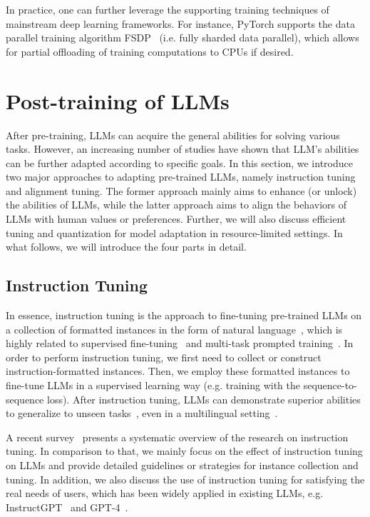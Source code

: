 In practice, one can further leverage the supporting training techniques of mainstream deep learning  frameworks. For instance, PyTorch supports the data parallel training algorithm  FSDP~\cite{FairScale2021} (i.e. fully sharded data parallel), which  allows for  partial offloading of training computations to CPUs if desired. 

\section{Post-training of LLMs}
\label{sec-adaptation}

After pre-training, LLMs can acquire the general abilities for  solving various tasks. However, an increasing number of studies have shown  that LLM's abilities can be further adapted according to specific goals. In this section, we introduce two major approaches to adapting pre-trained LLMs, namely instruction tuning and alignment tuning. The former approach  mainly aims to enhance (or unlock) the abilities of LLMs, while the latter approach aims to align the behaviors of LLMs with human values or preferences. Further, we will also discuss  efficient tuning and quantization for  model adaptation in resource-limited settings. In what follows, we will introduce the four parts in detail. 

\subsection{Instruction Tuning}
\label{sec-instruction}
In essence, instruction tuning is the approach to fine-tuning  pre-trained  LLMs on a collection of formatted instances in the form of natural language~\cite{Wei-ICLR-2022-Finetuned}, which is highly related to supervised fine-tuning~\cite{Ouyang-arxiv-2022-Training} and multi-task prompted training~\cite{Sanh-ICLR-2022-Multitask}. In order to perform instruction tuning, we first need to collect or construct instruction-formatted instances. Then, we employ these formatted instances to fine-tune LLMs in a supervised learning way (e.g. training with the sequence-to-sequence loss). After instruction tuning, LLMs can demonstrate superior abilities to generalize to unseen tasks~\cite{Wei-ICLR-2022-Finetuned,Sanh-ICLR-2022-Multitask,Chung-arxiv-2022-Scaling}, even in a multilingual setting~\cite{Muennighoff-2022-arxiv-Crosslingual}. 

A recent survey~\cite{Lou-arXiv-2023-Is} presents a systematic overview of the research on instruction tuning. In comparison to that, we mainly focus on the effect of instruction tuning on LLMs and provide detailed guidelines or strategies for instance collection and tuning. In addition, we also discuss the use of instruction tuning for satisfying the real needs of users, which has been widely applied in existing LLMs, e.g. InstructGPT~\cite{Ouyang-arxiv-2022-Training} and GPT-4~\cite{OpenAI-OpenAI-2023-GPT-4}.

